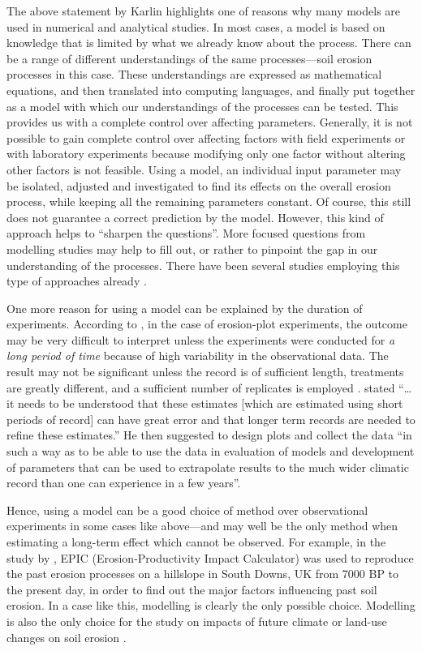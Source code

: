 The above statement by Karlin highlights one of reasons why many models are used
in numerical and analytical studies. In most cases, a model is based on
knowledge that is limited by what we already know about the process. There can
be a range of different understandings of the same processes---soil erosion
processes in this case. These understandings are expressed as mathematical
equations, and then translated into computing languages, and finally put
together as a model with which our understandings of the processes can be
tested. This provides us with a complete control over affecting parameters.
Generally, it is not possible to gain complete control over affecting factors
with field experiments or with laboratory experiments because modifying only
one factor without altering other factors is not feasible. Using a model, an
individual input parameter may be isolated, adjusted and investigated to find
its effects on the overall erosion process, while keeping all the remaining
parameters constant. Of course, this still does not guarantee a correct
prediction by the model. However, this kind of approach helps to ``sharpen the
questions''. More focused questions from modelling studies may help to fill out,
or rather to pinpoint the gap in our understanding of the processes. There have
been several studies employing this type of approaches already
\citep{favis-mortlock1995-365,favis-mortlock1999-329,pruski2002-7,
nearing2005-131}.

One more reason for using a model can be explained by the duration of
experiments. According to \citet{web_[Se-list]}, in the case of erosion-plot
experiments, the outcome may be very difficult to interpret unless the
experiments were conducted for \emph{a long period of time} because of high
variability in the observational data. The result may not be significant unless
the record is of sufficient length, treatments are greatly different, and a
sufficient number of replicates is employed \citep{nearing1999-1829}.
\citet{web_[Se-list]} stated ``\ldots it needs to be understood that these
estimates [which are estimated using short periods of record] can have great
error and that longer term records are needed to refine these estimates.'' He
then suggested to design plots and collect the data ``in such a way as to be
able to use the data in evaluation of models and development of parameters that
can be used to extrapolate results to the much wider climatic record than one
can experience in a few years''.

Hence, using a model can be a good choice of method over observational
experiments in some cases like above---and may well be the only method when
estimating a long-term effect which cannot be observed. For example, in the
study by \citet{favis-mortlock1997-79}, EPIC (Erosion-Productivity Impact
Calculator) was used to reproduce the past erosion processes on a hillslope in
South Downs, UK from 7000 BP to the present day, in order to find out the major
factors influencing past soil erosion. In a case like this, modelling is clearly
the only possible choice. Modelling is also the only choice for the study on
impacts of future climate or land-use changes on soil erosion
\citep{favis-mortlock1995-365,favis-mortlock1999-329,pruski2002-7,
pruski2002-climate,nearing2005-131}.

